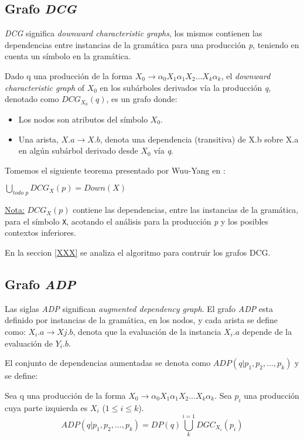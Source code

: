 \subsection{Grafo \textit{DCG}}

\textit{DCG} significa \textit{downward characteristic graphs}, los mismos contienen las dependencias entre instancias de la gramática para una producción \textit{p}, teniendo en cuenta un símbolo en la gramática.
\begin{definition}
Dado q una producción de la forma $X_{0}\rightarrow \alpha_{0} X_{1} \alpha_{1} X_{2} \dots X_{k} \alpha_{k}$, el \textit{downward characteristic graph} of $X_{0}$ en los subárboles derivados vía la producción \textit{q}, denotado como $DCG_{X_{0}}(q)$, es un grafo donde: 
\begin{itemize}
\item Los nodos son atributos del símbolo $X_{0}$.
\item Una arista, $X.a \rightarrow X.b$, denota una dependencia (transitiva) de X.b sobre X.a en algún subárbol derivado desde $X_{0}$ vía \textit{q}.
\end{itemize}
\end{definition}
Tomemos el siguiente teorema presentado por Wuu-Yang en \cite{wuu-yang1}:
\begin{theorem}
$\bigcup\limits_{\textit{todo p}}{DCG_{X} (p) = Down (X)}$
\end{theorem}
\underline{Nota:} $DCG_{X}(p)$ contiene las dependencias, entre las instancias de la gramática, para el símbolo \texttt{X}, acotando el análisis para la producción \textit{p} y los posibles contextos inferiores.

En la seccion \ref{XXX} se analiza el algoritmo para contruir los grafos DCG.

\subsection{Grafo \textit{ADP}}

Las siglas \textit{ADP} significan \textit{augmented dependency graph}. El grafo \textit{ADP} esta definido por instancias de la gramática, en los nodos, y cada arista se define como: $X_{i}.a\rightarrow X{j}.b$, denota que la evaluación de la instancia \textit{$X_{i}.a$} depende de la evaluación de \textit{$Y_{i}.b$}.

El conjunto de dependencias aumentadas se denota como $ADP (q | p_{1}, p_{2}, \dots, p_{k})$ y se define:
\begin{definition}
Sea q una producción de la forma $X_{0}\rightarrow \alpha_{0} X_{1} \alpha_{1} X_{2} \dots X_{k} \alpha_{k}$. Sea $p_{i}$ una producción cuya parte izquierda es $X_{i}$ ($1\leqslant i \leqslant k$). 
\begin{equation}
ADP (q | p_{1}, p_{2}, \dots, p_{k}) = DP(q) \bigcup\limits_{k}^{i=1}{DGC_{X_{i}}} (p_{i})
\end{equation}
\end{definition}

